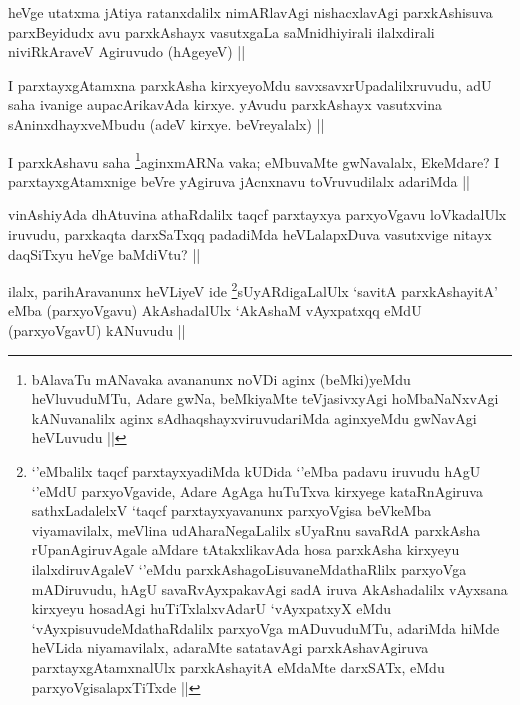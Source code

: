 
\begin{artha}
heVge utatxma jAtiya ratanxdalilx nimARlavAgi nishacxlavAgi parxkAshisuva parxBeyidudx avu parxkAshayx vasutxgaLa saMnidhiyirali ilalxdirali niviRkAraveV Agiruvudo (hAgeyeV) ||
\end{artha}

\begin{artha}
I parxtayxgAtamxna parxkAsha kirxyeyoMdu savxsavxrUpadalilxruvudu, adU saha ivanige aupacArikavAda kirxye. yAvudu parxkAshayx vasutxvina sAninxdhayxveMbudu (adeV kirxye. beVreyalalx) ||
\end{artha}

\begin{artha}
I parxkAshavu saha \footnote{bAlavaTu mANavaka avananunx noVDi aginx (beMki)yeMdu heVluvuduMTu, Adare gwNa, beMkiyaMte teVjasivxyAgi hoMbaNaNxvAgi kANuvanalilx aginx sAdhaqshayxviruvudariMda aginxyeMdu gwNavAgi heVLuvudu ||}aginxmARNa vaka; eMbuvaMte gwNavalalx, EkeMdare? I parxtayxgAtamxnige beVre yAgiruva jAcnxnavu toVruvudilalx adariMda ||
\end{artha}


\begin{artha}
vinAshiyAda dhAtuvina athaRdalilx taqcf parxtayxya parxyoVgavu loVkadalUlx iruvudu, parxkaqta darxSaTxqq padadiMda heVLalapxDuva vasutxvige nitayx daqSiTxyu heVge baMdiVtu? ||
\end{artha}


\begin{artha}
ilalx, parihAravanunx heVLiyeV ide \footnote{`\stext'eMbalilx taqcf parxtayxyadiMda kUDida `\stext'eMba padavu iruvudu hAgU `\stext'eMdU parxyoVgavide, Adare AgAga huTuTxva kirxyege kataRnAgiruva sathxLadalelxV `taqcf parxtayxyavanunx parxyoVgisa beVkeMba viyamavilalx, meVlina udAharaNegaLalilx sUyaRnu savaRdA parxkAsha rUpanAgiruvAgale aMdare tAtakxlikavAda hosa parxkAsha kirxyeyu ilalxdiruvAgaleV `\stext'eMdu parxkAshagoLisuvaneMdathaRlilx parxyoVga mADiruvudu, hAgU savaRvAyxpakavAgi sadA iruva AkAshadalilx vAyxsana kirxyeyu hosadAgi huTiTxlalxvAdarU `vAyxpatxyX eMdu `vAyxpisuvudeMdathaRdalilx parxyoVga mADuvuduMTu, adariMda hiMde heVLida niyamavilalx, adaraMte satatavAgi parxkAshavAgiruva parxtayxgAtamxnalUlx parxkAshayitA eMdaMte darxSATx, eMdu parxyoVgisalapxTiTxde ||}sUyARdigaLalUlx `savitA parxkAshayitA' eMba (parxyoVgavu) AkAshadalUlx `AkAshaM vAyxpatxqq eMdU (parxyoVgavU) kANuvudu ||
\end{artha}

